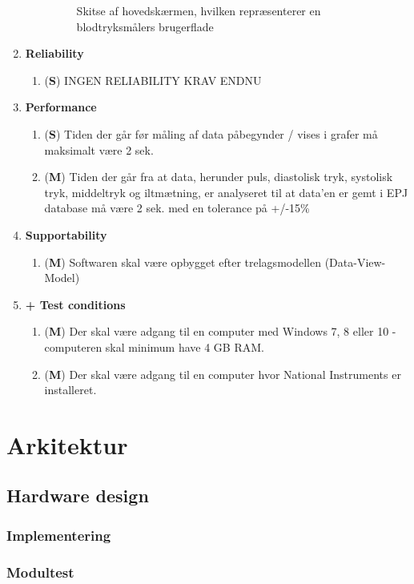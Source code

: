 \begin{enumerate}
\begin{enumerate}
\begin{figure}[h!]
\caption{Skitse af hovedskærmen, hvilken repræsenterer en blodtryksmålers brugerflade}
\end{figure}
\end{enumerate}
\item \textbf{Reliability}
\begin{enumerate}
\item (\textbf{S}) INGEN RELIABILITY KRAV ENDNU
\end{enumerate}
\item \textbf{Performance}
\begin{enumerate}
\item (\textbf{S}) Tiden der går før måling af data påbegynder / vises i grafer må maksimalt være 2 sek.
\item (\textbf{M}) Tiden der går fra at data, herunder puls, diastolisk tryk, systolisk tryk, middeltryk og iltmætning, er analyseret til at data'en er gemt i EPJ database må være 2 sek. med en tolerance på +/-15\%  
\end{enumerate}
\item \textbf{Supportability}
\begin{enumerate}
\item (\textbf{M}) Softwaren skal være opbygget efter trelagsmodellen (Data-View-Model)
\end{enumerate}
\item \textbf{+ Test conditions}
\begin{enumerate}
\item (\textbf{M}) Der skal være adgang til en computer med Windows 7, 8 eller 10 - computeren skal minimum have 4 GB RAM.
\item (\textbf{M}) Der skal være adgang til en computer hvor National Instruments er installeret.
\end{enumerate}
\end{enumerate}
\chapter{Arkitektur}
\section{Hardware design}
\subsection{Implementering}
\subsection{Modultest}
